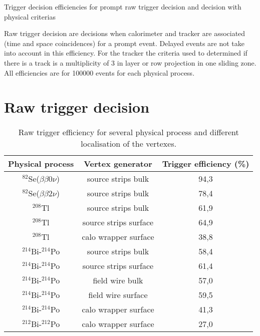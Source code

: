 \documentclass[12pt,a4paper]{article}
\newcommand{\BBZN}{$\beta\beta{}0\nu$}
\newcommand{\BBDN}{$\beta\beta{}2\nu$}
\newcommand{\SE}{$^{82}$Se}
\newcommand{\TL}{$^{208}$Tl}
\newcommand{\BIQ}{$^{214}$Bi}
\newcommand{\BID}{$^{212}$Bi}
\newcommand{\POQ}{$^{214}$Po}
\newcommand{\POD}{$^{212}$Po}
\begin{document}
\begin{center}
 \huge{Trigger decision efficiencies for prompt raw trigger decision and decision with physical criterias}
\end{center}

Raw trigger decision are decisions when calorimeter and tracker are associated (time and space coincidences) for a prompt event. Delayed events are not take into account in this efficiency.
For the tracker the criteria used to determined if there is a track is a multiplicity of 3 in layer or row projection in one sliding zone. All efficiencies are for 100000 events for each physical process.

\section{Raw trigger decision}
\begin{table}[!h]
 \begin{center}
  \begin{tabular}{|c||c|c|}
    \hline
    Physical process   & Vertex generator      & Trigger efficiency (\%)  \\
    \hline
    \SE(\BBZN)         & source strips bulk    & 94,3 \\
    \SE(\BBDN)         & source strips bulk    & 78,4 \\
    \TL                & source strips bulk    & 61,9 \\
    \TL                & source strips surface & 64,9 \\
    \TL                & calo wrapper surface  & 38,8 \\
    \BIQ-\POQ          & source strips bulk    & 58,4 \\
    \BIQ-\POQ          & source strips surface & 61,4 \\
    \BIQ-\POQ          & field wire bulk       & 57,0 \\
    \BIQ-\POQ          & field wire surface    & 59,5 \\
    \BIQ-\POQ          & calo wrapper surface  & 41,3 \\
    \BID-\POD          & calo wrapper surface  & 27,0 \\
    \hline
  \end{tabular}
  \end{center}
  \caption{Raw trigger efficiency for several physical process and different localisation of the vertexes.}
\label{raw_efficacity_trigger}
\end{table}
\end{document}
